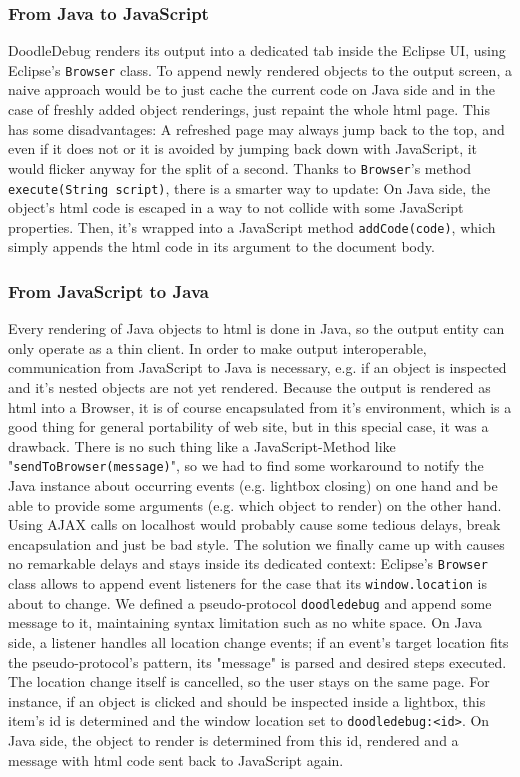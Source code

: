 \documentclass{report}
\begin{document}
\subsubsection*{From Java to JavaScript}
DoodleDebug renders its output into a dedicated tab inside the Eclipse UI, using Eclipse's \verb.Browser. class. To append newly rendered objects to the output screen, a naive approach would be to just cache the current code on Java side and in the case of freshly added object renderings, just repaint the whole html page. This has some disadvantages: A refreshed page may always jump back to the top, and even if it does not or it is avoided by jumping back down with JavaScript, it would flicker anyway for the split of a second. Thanks to \verb.Browser.'s method \verb.execute(String script)., there is a smarter way to update: On Java side, the object's html code is escaped in a way to not collide with some JavaScript properties. Then, it's wrapped into a JavaScript method \verb.addCode(code)., which simply appends the html code in its argument to the document body.
\subsubsection*{From JavaScript to Java}
Every rendering of Java objects to html is done in Java, so the output entity can only operate as a thin client.
In order to make output interoperable, communication from JavaScript to Java is necessary, e.g. if an object is inspected and it's nested objects are not yet rendered. Because the output is rendered as html into a Browser, it is of course encapsulated from it's environment, which is a good thing for general portability of web site, but in this special case, it was a drawback. There is no such thing like a JavaScript-Method like "\verb.sendToBrowser(message).", so we had to find some workaround to notify the Java instance about occurring events (e.g. lightbox closing) on one hand and be able to provide some arguments (e.g. which object to render) on the other hand. Using AJAX calls on localhost would probably cause some tedious delays, break encapsulation and just be bad style. The solution we finally came up with causes no remarkable delays and stays inside its dedicated context: Eclipse's \verb.Browser. class allows to append event listeners for the case that its \verb-window.location- is about to change. We defined a pseudo-protocol \verb-doodledebug- and append some message to it, maintaining syntax limitation such as no white space. On Java side, a listener handles all location change events; if an event's target location fits the pseudo-protocol's pattern, its "message" is parsed and desired steps executed. The location change itself is cancelled, so the user stays on the same page. For instance, if an object is clicked and should be inspected inside a lightbox, this item's id is determined and the window location set to \verb-doodledebug:<id>-. On Java side, the object to render is determined from this id, rendered and a message with html code sent back to JavaScript again.
\end{document}
